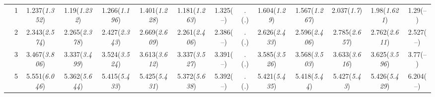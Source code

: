 \documentclass{article}
\begin{document}
\begin{table}[tbp]
{\begin{tabularx}{\textwidth}{lCCCCCCCCCCCCC}
&1&1.237\newline (\emph{1.352})&1.19\newline (\emph{1.232})&1.266\newline (\emph{1.196})&1.401\newline (\emph{1.228})&1.181\newline (\emph{1.263})&1.325\newline (--)&.\newline (\emph{.})&1.604\newline (\emph{1.29})&1.567\newline (\emph{1.267})&2.037\newline (\emph{1.7})&1.98\newline (\emph{1.621})&1.29\newline (--) \tabularnewline
&2&2.343\newline (\emph{2.574})&2.265\newline (\emph{2.378})&2.427\newline (\emph{2.343})&2.669\newline (\emph{2.609})&2.261\newline (\emph{2.406})&2.386\newline (--)&.\newline (\emph{.})&2.626\newline (\emph{2.433})&2.596\newline (\emph{2.406})&2.785\newline (\emph{2.657})&2.762\newline (\emph{2.611})&2.527\newline (--) \tabularnewline
&3&3.467\newline (\emph{3.806})&3.337\newline (\emph{3.499})&3.524\newline (\emph{3.524})&3.613\newline (\emph{3.612})&3.337\newline (\emph{3.527})&3.391\newline (--)&.\newline (\emph{.})&3.585\newline (\emph{3.526})&3.568\newline (\emph{3.503})&3.633\newline (\emph{3.616})&3.625\newline (\emph{3.596})&3.77\newline (--) \tabularnewline
&5&5.551\newline (\emph{6.046})&5.362\newline (\emph{5.644})&5.415\newline (\emph{5.433})&5.425\newline (\emph{5.431})&5.372\newline (\emph{5.638})&5.392\newline (--)&.\newline (\emph{.})&5.421\newline (\emph{5.435})&5.418\newline (\emph{5.44})&5.427\newline (\emph{5.43})&5.426\newline (\emph{5.429})&6.204\newline (--) \tabularnewline

\end{tabularx}}
\end{table}
\end{document}
